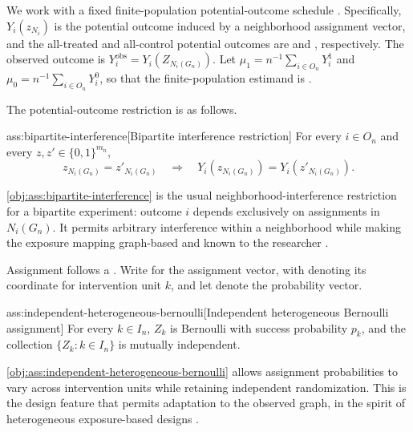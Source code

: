 \documentclass[11pt]{article}
\begin{document}
We work with a fixed finite-population potential-outcome schedule . Specifically, \(Y_i(z_{N_i})\) is the potential outcome induced by a neighborhood assignment vector, and the all-treated and all-control potential outcomes are  and , respectively. The observed outcome is \(Y_i^{\mathrm{obs}}=Y_i(Z_{N_i(G_n)})\). Let \(\mu_1=n^{-1}\sum_{i\in O_n}Y_i^1\) and \(\mu_0=n^{-1}\sum_{i\in O_n}Y_i^0\), so that the finite-population estimand is .

The potential-outcome restriction is as follows.

\begin{assumptionv}{ass:bipartite-interference}[Bipartite interference restriction]
For every $i\in O_n$ and every $z,z'\in\{0,1\}^{m_n}$,
\[
z_{N_i(G_n)}=z'_{N_i(G_n)}
\quad\Longrightarrow\quad
Y_i\!\left(z_{N_i(G_n)}\right)=Y_i\!\left(z'_{N_i(G_n)}\right).
\]
\end{assumptionv}

\cref{obj:ass:bipartite-interference} is the usual neighborhood-interference restriction for a bipartite experiment: outcome \(i\) depends exclusively on assignments in \(N_i(G_n)\). It permits arbitrary interference within a neighborhood while making the exposure mapping graph-based and known to the researcher \citep{LuShiFangZhangDing2025BipartiteDesign}.

Assignment follows a . Write  for the assignment vector, with  denoting its coordinate for intervention unit \(k\), and let  denote the probability vector.

\begin{assumptionv}{ass:independent-heterogeneous-bernoulli}[Independent heterogeneous Bernoulli assignment]
For every $k\in I_n$, $Z_k$ is Bernoulli with success probability $p_k$, and the collection $\{Z_k:k\in I_n\}$ is mutually independent.
\end{assumptionv}

\cref{obj:ass:independent-heterogeneous-bernoulli} allows assignment probabilities to vary across intervention units while retaining independent randomization. This is the design feature that permits adaptation to the observed graph, in the spirit of heterogeneous exposure-based designs \citep{Leung2019ApproxNeighborhoodInterference}.
\end{document}
